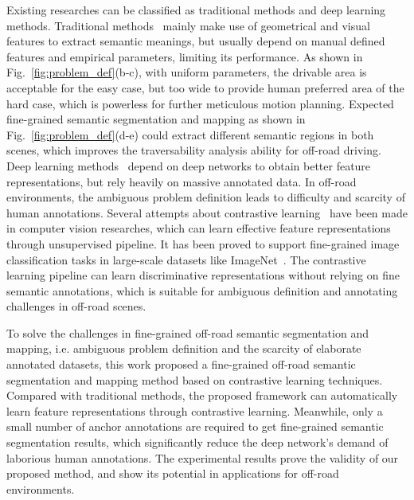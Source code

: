 \documentclass[letterpaper, 10 pt, conference]{ieeeconf}  %
\begin{document}
Existing researches can be classified as traditional methods and deep learning methods.
Traditional methods~\cite{thrun2006stanley}\cite{zhang2010lidar} mainly make use of geometrical and visual features to extract semantic meanings, but usually depend on manual defined features and empirical parameters, limiting its performance. As shown in Fig.~\ref{fig:problem_def}(b-c), with uniform parameters, the drivable area is acceptable for the easy case, but too wide to provide human preferred area of the hard case, which is powerless for further meticulous motion planning. Expected fine-grained semantic segmentation and mapping as shown in Fig.~\ref{fig:problem_def}(d-e) could extract different semantic regions in both scenes, which improves the traversability analysis ability for off-road driving.
Deep learning methods~\cite{siam2017deep} depend on deep networks to obtain better feature representations, but rely heavily on massive annotated data. In off-road environments, the ambiguous problem definition leads to difficulty and scarcity of human annotations.
Several attempts about contrastive learning~\cite{oord2018CPC}\cite{chen2020simple}\cite{he2020momentum} have been made in computer vision researches, which can learn effective feature representations through unsupervised pipeline. It has been proved to support fine-grained image classification tasks in large-scale datasets like ImageNet~\cite{deng2009imagenet}. The contrastive learning pipeline can learn discriminative representations without relying on fine semantic annotations, which is suitable for ambiguous definition and annotating challenges in off-road scenes.

To solve the challenges in fine-grained off-road semantic segmentation and mapping, i.e. ambiguous problem definition and the scarcity of elaborate annotated datasets, this work proposed a fine-grained off-road semantic segmentation and mapping method based on contrastive learning techniques. Compared with traditional methods, the proposed framework can automatically learn feature representations through contrastive learning. Meanwhile, only a small number of anchor annotations are required to get fine-grained semantic segmentation results, which significantly reduce the deep network's demand of laborious human annotations. The experimental results prove the validity of our proposed method, and show its potential in applications for off-road environments.
\end{document}
